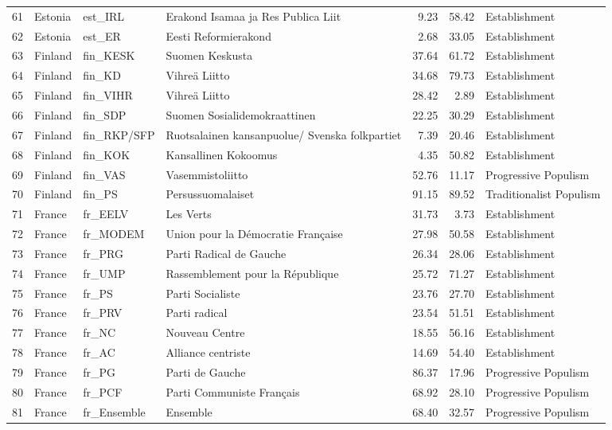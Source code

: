 \begin{longtable}[c]{@{\extracolsep{\fill}}rlllrrl}
		61 & Estonia & est\_IRL & Erakond Isamaa ja Res Publica Liit & 9.23 & 58.42 & Establishment \\
		62 & Estonia & est\_ER & Eesti Reformierakond & 2.68 & 33.05 & Establishment \\
		63 & Finland & fin\_KESK & Suomen Keskusta & 37.64 & 61.72 & Establishment \\
		64 & Finland & fin\_KD & Vihreä Liitto & 34.68 & 79.73 & Establishment \\
		65 & Finland & fin\_VIHR & Vihreä Liitto & 28.42 & 2.89 & Establishment \\
		66 & Finland & fin\_SDP & Suomen Sosialidemokraattinen & 22.25 & 30.29 & Establishment \\
		67 & Finland & fin\_RKP/SFP & Ruotsalainen kansanpuolue/ Svenska folkpartiet & 7.39 & 20.46 & Establishment \\
		68 & Finland & fin\_KOK & Kansallinen Kokoomus & 4.35 & 50.82 & Establishment \\
		69 & Finland & fin\_VAS & Vasemmistoliitto & 52.76 & 11.17 & Progressive Populism \\
		70 & Finland & fin\_PS & Persussuomalaiset & 91.15 & 89.52 & Traditionalist Populism \\
		71 & France & fr\_EELV & Les Verts & 31.73 & 3.73 & Establishment \\
		72 & France & fr\_MODEM & Union pour la Démocratie Française & 27.98 & 50.58 & Establishment \\
		73 & France & fr\_PRG & Parti Radical de Gauche & 26.34 & 28.06 & Establishment \\
		74 & France & fr\_UMP & Rassemblement pour la République & 25.72 & 71.27 & Establishment \\
		75 & France & fr\_PS & Parti Socialiste & 23.76 & 27.70 & Establishment \\
		76 & France & fr\_PRV & Parti radical & 23.54 & 51.51 & Establishment \\
		77 & France & fr\_NC & Nouveau Centre & 18.55 & 56.16 & Establishment \\
		78 & France & fr\_AC & Alliance centriste & 14.69 & 54.40 & Establishment \\
		79 & France & fr\_PG & Parti de Gauche & 86.37 & 17.96 & Progressive Populism \\
		80 & France & fr\_PCF & Parti Communiste Français & 68.92 & 28.10 & Progressive Populism \\
		81 & France & fr\_Ensemble & Ensemble & 68.40 & 32.57 & Progressive Populism \\

\end{longtable}
